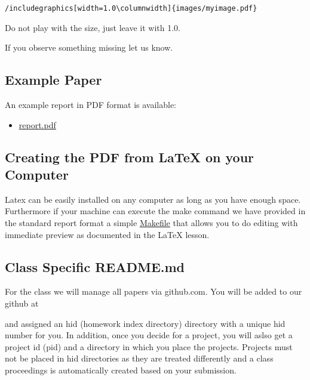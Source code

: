 \begin{itemize}[label=$\Box$]
       \verb|/includegraphics[width=1.0\columnwidth]{images/myimage.pdf}|

    Do not play with the size, just leave it with 1.0.

\end{itemize}


If you observe something missing let us know.

\subsection{Example Paper}\label{example-paper}

An example report in PDF format is available:

\begin{itemize}

\item
  \href{https://github.com/cloudmesh/classes/blob/master/docs/source/format/report/latex/report.pdf}{report.pdf}
\end{itemize}

\subsection{Creating the PDF from LaTeX on your
Computer}\label{creating-the-pdf-from-latex-on-your-computer}

Latex can be easily installed on any computer as long as you have
enough space. Furthermore if your machine can execute the make command
we have provided in the standard report format a simple
\href{https://github.com/cloudmesh/classes/blob/master/docs/source/format/report/latex/Makefile}{Makefile}
that allows you to do editing with immediate preview as documented in
the LaTeX lesson.

\subsection{Class Specific README.md}\label{class-specific-readme.md}

For the class we will manage all papers via github.com. You will be
added to our github at


and assigned an hid (homework index directory) directory with a unique
hid number for you. In addition, once you decide for a project, you will
aslso get a project id (pid) and a directory in which you place the
projects. Projects must not be placed in hid directories as they are
treated differently and a class proceedings is automatically created
based on your submission.

